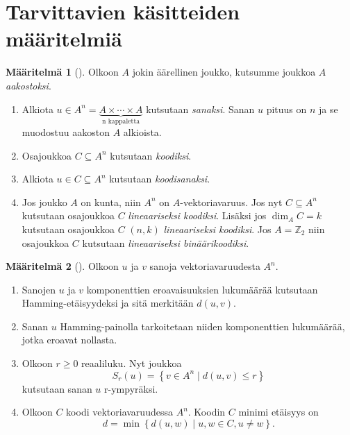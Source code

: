 \documentclass[a4paper,12pt,leqno,oneside]{report} %
\theoremstyle{plain}
\newtheorem{lause}{Lause}[chapter]
\theoremstyle{definition}
\newtheorem{maaritelma}{Määritelmä}[chapter]
\theoremstyle{remark}
\numberwithin{equation}{chapter}
\newcommand*{\Zset}{\mathbb{Z}}  %
\begin{document}
    \section{Tarvittavien käsitteiden määritelmiä}
    \begin{maaritelma}[{\cite[s.~491]{PA}}]
        Olkoon $A$ jokin äärellinen joukko, kutsumme joukkoa $A$ \emph{aakostoksi}.

        \begin{enumerate}
            \item Alkiota $u \in  A^n = \underbrace{A \times \cdots \times A}_{\text{n kappaletta}}$ kutsutaan \emph{sanaksi}. Sanan $u$ pituus on $n$ ja se muodostuu aakoston $A$ alkioista.
            \item Osajoukkoa $C \subseteq A^n$ kutsutaan \emph{koodiksi}.
            \item Alkiota $u \in C \subseteq A^n$ kutsutaan \emph{koodisanaksi}.
            \item Jos joukko $A$ on kunta, niin $A^n$ on $A$-vektoriavaruus. Jos nyt $C \subseteq A^n$ kutsutaan osajoukkoa $C$ \emph{lineaariseksi koodiksi}. Lisäksi jos $\dim_A C = k$ kutsutaan osajoukkoa $C$ $(n, k)$ \emph{lineaariseksi koodiksi}. Jos $A = \Zset_2$ niin osajoukkoa $C$ kutsutaan \emph{lineaariseksi binäärikoodiksi}.
        \end{enumerate}
    \end{maaritelma}




    \begin{maaritelma}[{\cite[s.~492]{PA}}]
        Olkoon $u$ ja $v$ sanoja vektoriavaruudesta $A^n$.
        \begin{enumerate}
            \item Sanojen $u$ ja $v$ komponenttien eroavaisuuksien lukumäärää kutsutaan Hamming-etäisyydeksi ja sitä merkitään $d(u,v)$.
            \item Sanan $u$ Hamming-painolla tarkoitetaan niiden komponenttien lukumäärää, jotka eroavat nollasta.
            \item Olkoon $r\ge0$ reaaliluku. Nyt joukkoa
                \[
                    S_r\left(u\right) = \left\{v \in A^n \mid d\left(u, v\right) \le r \right\}
                \]
                kutsutaan sanan $u$ r-ympyräksi.
            \item Olkoon $C$ koodi vektoriavaruudessa $A^n$. Koodin $C$ minimi etäisyys on
                \[
                    d = \min\left\{ d\left(u, w\right) \mid u, w \in C, u \neq w \right\}.
                \]
        \end{enumerate}
    \end{maaritelma}
\end{document}
